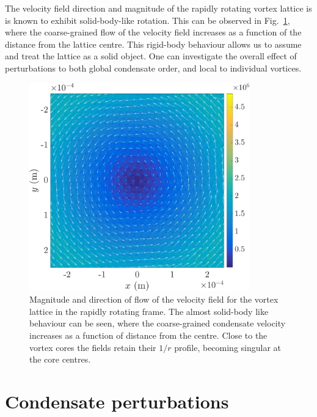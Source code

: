The velocity field direction and magnitude of the rapidly rotating vortex lattice is is known to exhibit solid-body-like rotation. This can be observed in Fig.~\ref{fig:solidbody}, where the coarse-grained flow of the velocity field increases as a function of the distance from the lattice centre. This rigid-body behaviour allows us to assume and treat the lattice as a solid object. One can investigate the overall effect of perturbations to both global condensate order, and local to individual vortices.
\begin{figure}\centering
    \includegraphics[width=0.85\textwidth,clip,trim={0cm 2cm 0 2cm}]{Images/ch4_vtx/velocity/solidbody}
    \caption{Magnitude and direction of flow of the velocity field for the vortex lattice in the rapidly rotating frame. The almost solid-body like behaviour can be seen, where the coarse-grained condensate velocity increases as a function of distance from the centre. Close to the vortex cores the fields retain their $1/r$ profile, becoming singular at the core centres.}
    \label{fig:solidbody}
\end{figure}

\section{Condensate perturbations}
